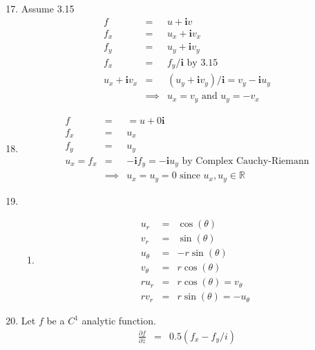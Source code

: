 \documentclass{article}%
\newcommand\I{\textbf{i}}
\begin{document}
\begin{enumerate}
\begin{enumerate}[label*=\arabic*.]
        \setcounter{enumii}{16}
        \item %
            Assume 3.15
            \begin{eqnarray*}
                f &=& u+\I v \\
                f_x &=& u_x + \I v_x \\
                f_y &=& u_y + \I v_y \\
                f_x &=& f_y /\I \text{ by 3.15} \\
                u_x + \I v_x &=& (u_y + \I v_y)/\I = v_y -\I u_y \\
                &\implies& u_x = v_y \text{ and }  u_y =-v_x
            \end{eqnarray*}
        \setcounter{enumii}{19}
        \item %
            \begin{eqnarray*}
                f &=&= u+0\I\\
                f_x &=& u_x \\
                f_y &=& u_y \\
                u_x = f_x &=& -\I f_y = -\I u_y \text{ by Complex Cauchy-Riemann} \\
                &\implies& u_x = u_y = 0 \text{ since $u_x, u_y \in \mathbb{R}$}
            \end{eqnarray*}
        \item %
            \begin{enumerate}[label=(\alph*)]
                \item %
                    \begin{eqnarray*}
                        u_r &=& \cos(\theta) \\
                        v_r &=& \sin(\theta) \\
                        u_\theta &=& -r \sin(\theta) \\
                        v_\theta &=& r \cos(\theta) \\
                        r u_r &=& r \cos(\theta) = v_\theta  \\
                        r v_r &=& r \sin(\theta) = -u_\theta
                    \end{eqnarray*}
            \end{enumerate}
        \setcounter{enumii}{24}
        \item %
            Let $f$ be a $C^1$ analytic function.
            \begin{eqnarray*}
                \frac{\partial f}{\partial \bar{z}} &=& 0.5 (f_x - f_y/i) \\

\end{eqnarray*}
\end{enumerate}
\end{enumerate}
\end{document}
